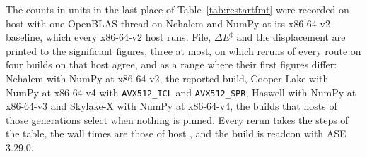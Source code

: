 The counts in units in the last place of Table~\ref*{tab:restartfmt} were recorded on host \rfHost{} with one OpenBLAS thread on Nehalem and NumPy at its x86-64-v2 baseline, which every x86-64-v2 host runs. File, $\Delta E^\ddagger$ and the displacement are printed to the significant figures, three at most, on which reruns of every route on four builds on that host agree, and as a range where their first figures differ: Nehalem with NumPy at x86-64-v2, the reported build, Cooper Lake with NumPy at x86-64-v4 with \texttt{AVX512\_ICL} and \texttt{AVX512\_SPR}, Haswell with NumPy at x86-64-v3 and Skylake-X with NumPy at x86-64-v4, the builds that hosts of those generations select when nothing is pinned. Every rerun takes the steps of the table, the wall times are those of host \rfWallHost{}, and the build is readcon \readconCargoVersion{} with ASE 3.29.0.
